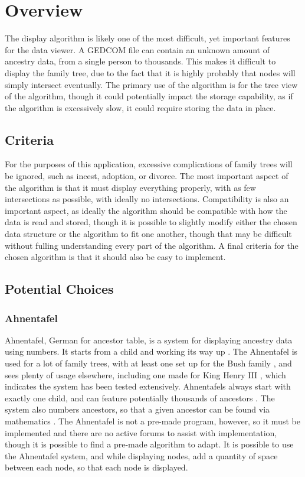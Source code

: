 \documentclass[onecolumn, draftclsnofoot,10pt, compsoc]{IEEEtran}
\begin{document}
\section{Overview}
The display algorithm is likely one of the most difficult, yet important features for the data viewer. A GEDCOM file can contain an unknown amount of ancestry data, from a single person to thousands. This makes it difficult to display the family tree, due to the fact that it is highly probably that nodes will simply intersect eventually. The primary use of the algorithm is for the tree view of the algorithm, though it could potentially impact the storage capability, as if the algorithm is excessively slow, it could require storing the data in place.

\subsection{Criteria}
For the purposes of this application, excessive complications of family trees will be ignored, such as incest, adoption, or divorce. The most important aspect of the algorithm is that it must display everything properly, with as few intersections as possible, with ideally no intersections. Compatibility is also an important aspect, as ideally the algorithm should be compatible with how the data is read and stored, though it is possible to slightly modify either the chosen data structure or the algorithm to fit one another, though that may be difficult without fulling understanding every part of the algorithm. A final criteria for the chosen algorithm is that it should also be easy to implement.
\subsection{Potential Choices}
\subsubsection{Ahnentafel}
Ahnentafel, German for ancestor table, is a system for displaying ancestry data using numbers. It starts from a child and working its way up \cite{5}. The Ahnentafel is used for a lot of family trees, with at least one set up for the Bush family \cite{5}, and sees plenty of usage elsewhere, including one made for King Henry III \cite{6}, which indicates the system has been tested extensively. Ahnentafels always start with exactly one child, and can feature potentially thousands of ancestors \cite{5}. The system also numbers ancestors, so that a given ancestor can be found via mathematics \cite{5}. The Ahnentafel is not a pre-made program, however, so it must be implemented and there are no active forums to assist with implementation, though it is possible to find a pre-made algorithm to adapt. It is possible to use the Ahnentafel system, and while displaying nodes, add a quantity of space between each node, so that each node is displayed.
\end{document}
